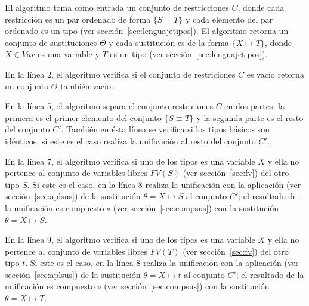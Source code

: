 \documentclass{article}
\begin{document}
\begin{algorithm}[h!]
  \DontPrintSemicolon
  \LinesNumbered
  \caption{$unify(C)$}\label{alg:unificacion}
\end{algorithm}

El algoritmo toma como entrada un conjunto de restricciones $C$, donde
cada restricción es un par ordenado de forma $\{ S = T \}$ y cada
elemento del par ordenado es un tipo (ver
sección~\ref{sec:lenguajetipos}). El algoritmo retorna un conjunto de
sustituciones $\Theta$ y cada sustitución es de la forma
$\{ X \mapsto T\}$, donde $X \in Var$ es una variable y $T$ es un tipo
(ver sección~\ref{sec:lenguajetipos}).

En la línea 2, el algoritmo verifica si el conjunto de restriciones
$C$ es vacío retorna un conjunto $\Theta$ también vacío.

En la línea 5, el algoritmo separa el conjunto restriciones $C$ en dos
partes: la primera es el primer elemento del conjunto $\{ S \equiv T
\}$ y la segunda parte es el resto del conjunto $C'$. También en ésta
línea se verifica si los tipos básicos son idénticos, si este es el
caso realiza la unificación al resto del conjunto $C'$.

En la línea 7, el algoritmo verifica si uno de los tipos es una
variable $X$ y ella no pertence al conjunto de variables libres
$FV(S)$ (ver sección~\ref{sec:fv}) del otro tipo $S$. Si este es el
caso, en la línea 8 realiza la unificación con la aplicación (ver
sección~\ref{sec:aplsus}) de la sustitución $\theta = X \mapsto S $ al
conjunto $C'$; el resultado de la unificación es compuesto $\circ$
(ver sección~\ref{sec:compsus}) con la sustitución
$\theta = X \mapsto S $.

En la línea 9, el algoritmo verifica si uno de los tipos es una
variable $X$ y ella no pertence al conjunto de variables libres
$FV(T)$ (ver sección~\ref{sec:fv}) del otro tipo $t$. Si este es el
caso, en la línea 8 realiza la unificación con la aplicación (ver
sección~\ref{sec:aplsus}) de la sustitución $\theta = X \mapsto t $ al
conjunto $C'$; el resultado de la unificación es compuesto $\circ$
(ver sección~\ref{sec:compsus}) con la sustitución
$\theta = X \mapsto T $.
\end{document}
